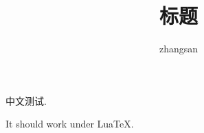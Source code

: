 \documentclass{ctexart}
\title{标题}
\author{zhangsan}
\begin{document}
中文测试.

It should work under Lua\TeX{}.
\end{document}
